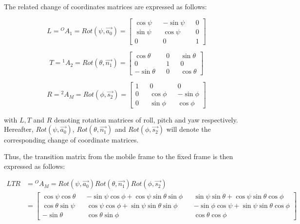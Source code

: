 \documentclass{thesisreport}
\begin{document}
\newpage

The related change of coordinates matrices are expressed as follows:


\begin{equation}
	L = {}^{O}A_1 = Rot(\psi, \overrightarrow{a_0}) = \begin{bmatrix}
	\cos \psi && - \sin \psi && 0 \\
	\sin \psi && \cos \psi && 0 \\
	0 && 0 && 1 
	\end{bmatrix}
\end{equation}

\begin{equation}
	T = {}^{1}A_2 = Rot(\theta, \overrightarrow{n_1}) = \begin{bmatrix}
	\cos \theta && 0 && \sin \theta \\
	0 && 1 && 0 \\
	- \sin \theta && 0 && \cos \theta 
	\end{bmatrix}
\end{equation}

\begin{equation}
	R = {}^{2}A_M = Rot(\phi, \overrightarrow{s_2}) = \begin{bmatrix}
	1 && 0 && 0 \\
	0 && \cos \phi && - \sin \phi \\
	0 && \sin \phi && \cos \phi 
	\end{bmatrix}
\end{equation}

with $L, T$ and $R$ denoting rotation matrices of roll, pitch and yaw respectively.
Hereafter, $Rot(\psi, \overrightarrow{a_0})$, $Rot(\theta, \overrightarrow{n_1})$ and $Rot(\phi, \overrightarrow{s_2})$ will denote the corresponding change of coordinate matrices.

Thus, the transition matrix from the mobile frame to the fixed frame is then expressed as follows: 

\begin{align}
	LTR &= {}^{O}A_M = Rot(\psi, \overrightarrow{a_0}) Rot(\theta, \overrightarrow{n_1}) Rot(\phi, \overrightarrow{s_2}) \nonumber \\
	&= \begin{bmatrix}
	\cos \psi \cos \theta && - \sin \psi \cos \phi + \cos \psi \sin \theta \sin \phi && \sin \psi \sin \theta + \cos \psi \sin \theta \cos \phi \\
	\cos \theta \sin \psi && \cos \psi \cos \phi + \sin \psi \sin \theta \sin \phi && - \sin \phi \cos \psi + \sin \psi \sin \theta \cos \phi \\
	-\sin \theta && \cos \theta \sin \phi && \cos \theta \cos \phi
	\end{bmatrix}
\end{align}
\end{document}
